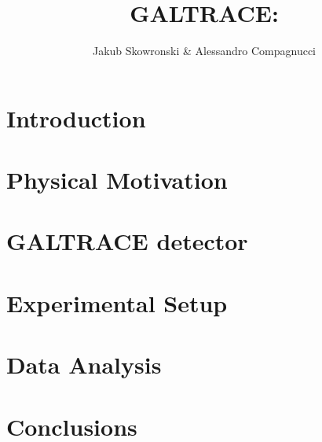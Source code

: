 \documentclass[a4paper, 11pt]{article}
\author{Jakub Skowronski \& Alessandro Compagnucci}
\title{GALTRACE: }
\begin{document}
\maketitle

\clearpage

\tableofcontents

\clearpage

\section{Introduction}



\clearpage

\section{Physical Motivation}



\clearpage

\section{GALTRACE detector}



\clearpage

\section{Experimental Setup}



\clearpage

\section{Data Analysis}



\clearpage

\section{Conclusions}



\clearpage


\end{document}
